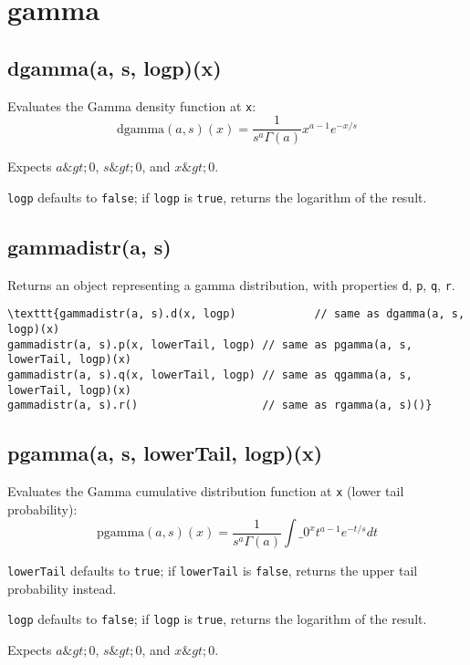 \documentclass{article}
\begin{document}
  \section{gamma}
    \subsection*{dgamma(a, s, logp)(x)}
    Evaluates the Gamma density function at \texttt{x}:
$$\textrm{dgamma}(a, s)(x) = \frac{1}{s^a\Gamma(a)}x^{a-1}e^{-x/s}$$


Expects $a \&gt; 0$, $s \&gt; 0$, and $x \&gt; 0$.


\texttt{logp} defaults to \texttt{false}; if \texttt{logp} is \texttt{true}, returns the
logarithm of the result.


    \subsection*{gammadistr(a, s)}
    Returns an object representing a gamma distribution, with properties \texttt{d}, \texttt{p}, \texttt{q}, \texttt{r}.


\begin{lstlisting}
\texttt{gammadistr(a, s).d(x, logp)            // same as dgamma(a, s, logp)(x)
gammadistr(a, s).p(x, lowerTail, logp) // same as pgamma(a, s, lowerTail, logp)(x)
gammadistr(a, s).q(x, lowerTail, logp) // same as qgamma(a, s, lowerTail, logp)(x)
gammadistr(a, s).r()                   // same as rgamma(a, s)()}\end{lstlisting}

    \subsection*{pgamma(a, s, lowerTail, logp)(x)}
    Evaluates the Gamma cumulative distribution
function at \texttt{x} (lower tail probability):
$$\textrm{pgamma}(a, s)(x) = \frac{1}{s^a\Gamma(a)}\int\_0^x t^{a-1}e^{-t/s}dt$$


\texttt{lowerTail} defaults to \texttt{true}; if \texttt{lowerTail} is \texttt{false}, returns
the upper tail probability instead.


\texttt{logp} defaults to \texttt{false}; if \texttt{logp} is \texttt{true}, returns the logarithm
of the result.


Expects $a \&gt; 0$, $s \&gt; 0$, and $x \&gt; 0$.
\end{document}
